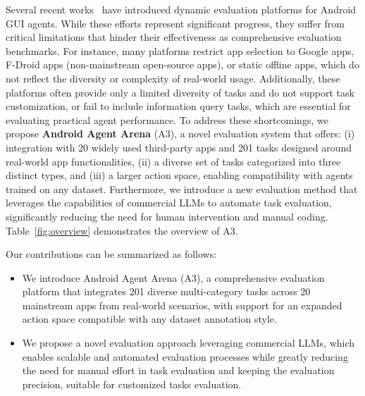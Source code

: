 \documentclass[11pt]{article}
\begin{document}
Several recent works~\citep{rawles2024androidworld, xing2024androidarena, xu2024androidlab, lee2024bmoca, zhang2023mobileenv} have introduced dynamic evaluation platforms for Android GUI agents. While these efforts represent significant progress, they suffer from critical limitations that hinder their effectiveness as comprehensive evaluation benchmarks. For instance, many platforms restrict app selection to Google apps, F-Droid apps (non-mainstream open-source apps), or static offline apps, which do not reflect the diversity or complexity of real-world usage. Additionally, these platforms often provide only a limited diversity of tasks and do not support task customization, or fail to include information query tasks, which are essential for evaluating practical agent performance. To address these shortcomings, we propose \textbf{Android Agent Arena} (A3), a novel evaluation system that offers: (i) integration with 20 widely used third-party apps and 201 tasks designed around real-world app functionalities, (ii) a diverse set of tasks categorized into three distinct types, and (iii) a larger action space, enabling compatibility with agents trained on any dataset. Furthermore, we introduce a new evaluation method that leverages the capabilities of commercial LLMs to automate task evaluation, significantly reducing the need for human intervention and manual coding. Table~\ref{fig:overview} demonstrates the overview of A3.

Our contributions can be summarized as follows:
\begin{itemize}[leftmargin=5mm]
\item We introduce Android Agent Arena (A3), a comprehensive evaluation platform that integrates 201 diverse multi-category tasks across 20 mainstream apps from real-world scenarios, with support for an expanded action space compatible with any dataset annotation style. 
\item We propose a novel evaluation approach leveraging commercial LLMs, which enables scalable and automated evaluation processes while greatly reducing the need for manual effort in task evaluation and keeping the evaluation precision, suitable for customized tasks evaluation.
\end{itemize}
\end{document}
